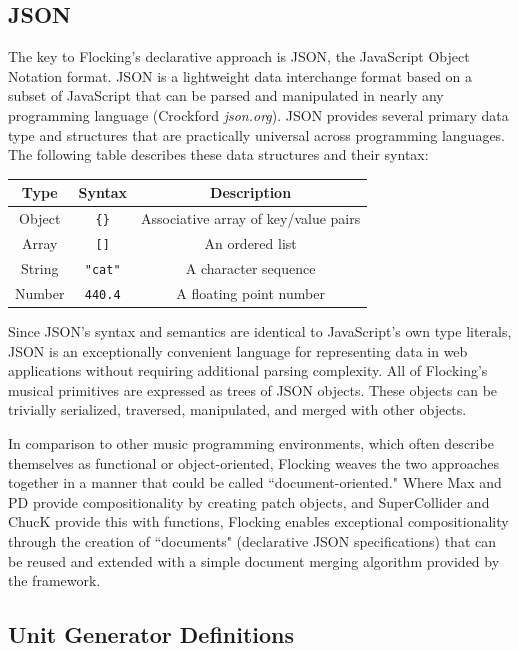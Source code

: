 \documentclass{article}
\begin{document}
\subsection{JSON}

The key to Flocking's declarative approach is JSON, the JavaScript Object Notation format. JSON is a lightweight data interchange format based on a subset of JavaScript that can be parsed and manipulated in nearly any programming language (Crockford {\it json.org}). JSON provides several primary data type and structures that are practically universal across programming languages. The following table describes these data structures and their syntax:

\begin{tabular}{| c || c | c |}
    \hline
    \bf{Type} & \bf{Syntax} & \bf{Description} \\ \hline
    Object & \verb|{}| & Associative array of key/value pairs \\ \hline
    Array & \verb|[]| & An ordered list \\ \hline
    String & \verb|"cat"| & A character sequence \\ \hline
    Number & \verb|440.4| & A floating point number \\ \hline
\end{tabular}

Since JSON's syntax and semantics are identical to JavaScript's own type literals, JSON is an exceptionally convenient language for representing data in web applications without requiring additional parsing complexity. All of Flocking's musical primitives are expressed as trees of JSON objects. These objects can be trivially serialized, traversed, manipulated, and merged with other objects.

In comparison to other music programming environments, which often describe themselves as functional or object-oriented, Flocking weaves the two approaches together in a manner that could be called ``document-oriented." Where Max and PD provide compositionality by creating patch objects, and SuperCollider and ChucK provide this with functions, Flocking enables exceptional compositionality through the creation of ``documents" (declarative JSON specifications) that can be reused and extended with a simple document merging algorithm provided by the framework.

\subsection{Unit Generator Definitions}
\end{document}
